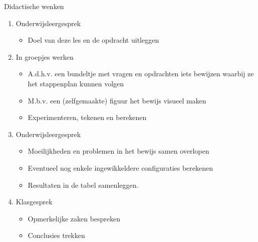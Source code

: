 \documentclass[dutch]{beamer}
\begin{document}
\begin{frame}{Didactische wenken}

\begin{enumerate}
	\item Onderwijsleergesprek
	\begin{itemize}
	\item Doel van deze les en de opdracht uitleggen
\end{itemize}
	
	\item In groepjes werken
	\begin{itemize}
	\item A.d.h.v. een bundeltje met vragen en opdrachten iets bewijzen waarbij ze het stappenplan kunnen volgen
	\item M.b.v. een (zelfgemaakte) figuur het bewijs visueel maken
	\item Experimenteren, tekenen en berekenen
\end{itemize}

  \item Onderwijsleergesprek
  \begin{itemize}
  \item Moeilijkheden en problemen in het bewijs samen overlopen
  \item Eventueel nog enkele ingewikkeldere configuraties berekenen
	\item Resultaten in de tabel samenleggen.
\end{itemize}

  \item Klasgesprek
  \begin{itemize}
	  \item Opmerkelijke zaken bespreken
	  \item Conclusies trekken
  \end{itemize}
\end{enumerate}
\end{frame}


%
\end{document}
